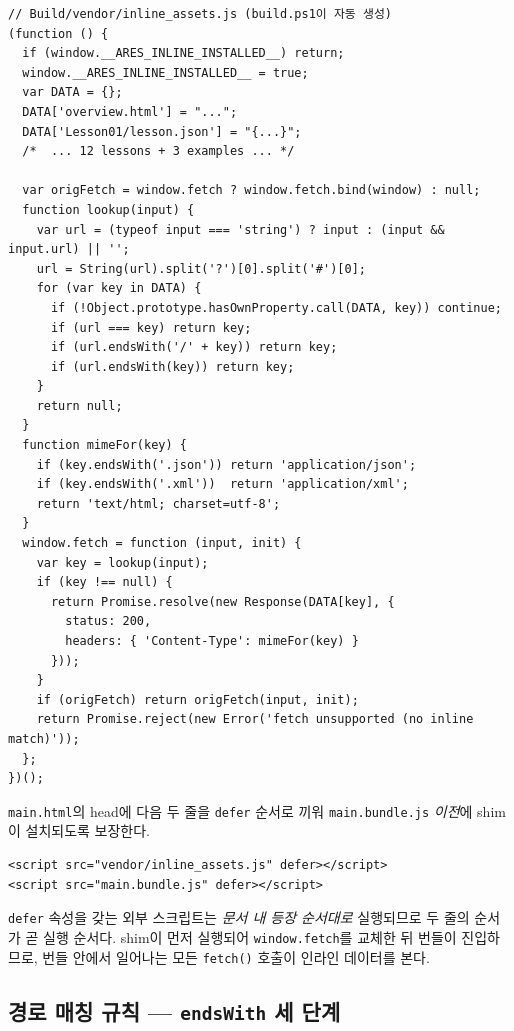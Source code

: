 \documentclass[11pt, oneside]{article}
\begin{document}
\begin{verbatim}
// Build/vendor/inline_assets.js (build.ps1이 자동 생성)
(function () {
  if (window.__ARES_INLINE_INSTALLED__) return;
  window.__ARES_INLINE_INSTALLED__ = true;
  var DATA = {};
  DATA['overview.html'] = "...";
  DATA['Lesson01/lesson.json'] = "{...}";
  /*  ... 12 lessons + 3 examples ... */

  var origFetch = window.fetch ? window.fetch.bind(window) : null;
  function lookup(input) {
    var url = (typeof input === 'string') ? input : (input && input.url) || '';
    url = String(url).split('?')[0].split('#')[0];
    for (var key in DATA) {
      if (!Object.prototype.hasOwnProperty.call(DATA, key)) continue;
      if (url === key) return key;
      if (url.endsWith('/' + key)) return key;
      if (url.endsWith(key)) return key;
    }
    return null;
  }
  function mimeFor(key) {
    if (key.endsWith('.json')) return 'application/json';
    if (key.endsWith('.xml'))  return 'application/xml';
    return 'text/html; charset=utf-8';
  }
  window.fetch = function (input, init) {
    var key = lookup(input);
    if (key !== null) {
      return Promise.resolve(new Response(DATA[key], {
        status: 200,
        headers: { 'Content-Type': mimeFor(key) }
      }));
    }
    if (origFetch) return origFetch(input, init);
    return Promise.reject(new Error('fetch unsupported (no inline match)'));
  };
})();
\end{verbatim}

\texttt{main.html}의 head에 다음 두 줄을 \texttt{defer} 순서로 끼워
\texttt{main.bundle.js} \emph{이전}에 shim 이 설치되도록 보장한다.

\begin{verbatim}
<script src="vendor/inline_assets.js" defer></script>
<script src="main.bundle.js" defer></script>
\end{verbatim}

\begin{keypoint}
\texttt{defer} 속성을 갖는 외부 스크립트는 \emph{문서 내 등장 순서대로}
실행되므로 두 줄의 순서가 곧 실행 순서다. shim이 먼저 실행되어
\texttt{window.fetch}를 교체한 뒤 번들이 진입하므로, 번들 안에서 일어나는
모든 \texttt{fetch()} 호출이 인라인 데이터를 본다.
\end{keypoint}

\subsection{경로 매칭 규칙 --- \texttt{endsWith} 세 단계}
\end{document}
